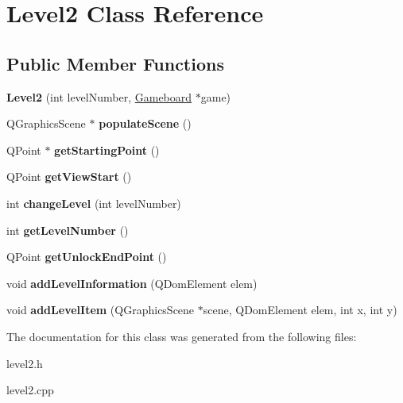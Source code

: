 \hypertarget{class_level2}{}\section{Level2 Class Reference}
\label{class_level2}
\subsection*{Public Member Functions}
\begin{DoxyCompactItemize}
\item 
\hypertarget{class_level2_a245cab1175dfdb4b3561a7317e05ebd1}{}{\bfseries Level2} (int level\+Number, \hyperlink{class_gameboard}{Gameboard} $\ast$game)\label{class_level2_a245cab1175dfdb4b3561a7317e05ebd1}

\item 
\hypertarget{class_level2_a3429efd969734df0725bda5a0ef31bb3}{}Q\+Graphics\+Scene $\ast$ {\bfseries populate\+Scene} ()\label{class_level2_a3429efd969734df0725bda5a0ef31bb3}

\item 
\hypertarget{class_level2_aa2117b86b6ba46bc91fa6bdbb0cfb058}{}Q\+Point $\ast$ {\bfseries get\+Starting\+Point} ()\label{class_level2_aa2117b86b6ba46bc91fa6bdbb0cfb058}

\item 
\hypertarget{class_level2_ae00d67c53b25def82750bad0e296d1ef}{}Q\+Point {\bfseries get\+View\+Start} ()\label{class_level2_ae00d67c53b25def82750bad0e296d1ef}

\item 
\hypertarget{class_level2_ae9daa2b7d3b03be6cfd885fb641db8b0}{}int {\bfseries change\+Level} (int level\+Number)\label{class_level2_ae9daa2b7d3b03be6cfd885fb641db8b0}

\item 
\hypertarget{class_level2_afc7097e892ccfb17fcc8846c9fda4910}{}int {\bfseries get\+Level\+Number} ()\label{class_level2_afc7097e892ccfb17fcc8846c9fda4910}

\item 
\hypertarget{class_level2_a7e8c1628b703886e61a00f755dc2038b}{}Q\+Point {\bfseries get\+Unlock\+End\+Point} ()\label{class_level2_a7e8c1628b703886e61a00f755dc2038b}

\item 
\hypertarget{class_level2_a6c6c7c86949a63afde397fdd7c76b01c}{}void {\bfseries add\+Level\+Information} (Q\+Dom\+Element elem)\label{class_level2_a6c6c7c86949a63afde397fdd7c76b01c}

\item 
\hypertarget{class_level2_a87a8120e0107e8d7029480ff0e473b05}{}void {\bfseries add\+Level\+Item} (Q\+Graphics\+Scene $\ast$scene, Q\+Dom\+Element elem, int x, int y)\label{class_level2_a87a8120e0107e8d7029480ff0e473b05}

\end{DoxyCompactItemize}


The documentation for this class was generated from the following files\+:\begin{DoxyCompactItemize}
\item 
level2.\+h\item 
level2.\+cpp\end{DoxyCompactItemize}
